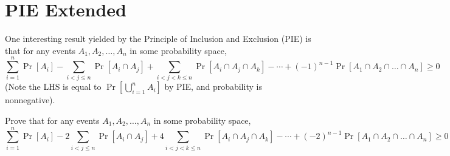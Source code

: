 \documentclass{article}
\let\oldsum\sum
\renewcommand{\sum}[2]{\oldsum\limits_{#1}^{#2}}
\begin{document}
\section{PIE Extended}
\begin{hw}
	One interesting result yielded by the Principle of Inclusion and Exclusion (PIE) is that for any events $A_1, A_2, \dots, A_n$ in some probability space,
	\[
	\sum{i=1}{n} \Pr\left[A_i\right]
	- \sum{i<j\leq n}{} \Pr\left[A_i \cap A_j\right]
	+ \sum{i<j<k\leq n}{} \Pr\left[A_i \cap A_j \cap A_k\right]
	- \cdots
	+ (-1)^{n-1} \Pr\left[A_1 \cap A_2 \cap \dots \cap A_n\right]
	\geq 0
	\]
	(Note the LHS is equal to $\Pr\left[\bigcup_{i=1}^n A_i\right]$ by PIE, and probability is nonnegative).
	
	Prove that for any events $A_1, A_2, \dots, A_n$ in some probability space,
	\[
	\sum{i=1}{n} \Pr\left[A_i\right]
	- 2\sum{i<j\leq n}{} \Pr\left[A_i \cap A_j\right]
	+ 4\sum{i<j<k\leq n}{} \Pr\left[A_i \cap A_j \cap A_k\right]
	- \cdots
	+ (-2)^{n-1} \Pr\left[A_1 \cap A_2 \cap \dots \cap A_n\right]
	\geq 0
	\]
\end{hw}
\end{document}
